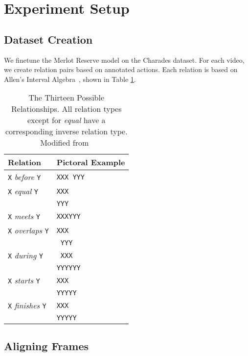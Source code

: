 \section{Experiment Setup}
\label{sec:setup}

\subsection{Dataset Creation}
\label{sec:data}

We finetune the Merlot Reserve model on the Charades dataset. For each video,
we create relation pairs based on annotated actions. Each relation is based on
Allen's Interval Algebra~\citep{allen1983interval}, shown in Table
\ref{tab:allen_interval}.

\begin{table}[htpb]
	\centering
	\caption{The Thirteen Possible Relationships. All relation types except for
		\textit{equal} have a corresponding inverse relation type. Modified
		from~\cite{allen1983interval}}
	\label{tab:allen_interval}
	\begin{tabular}{ll}
	Relation & Pictoral Example \\
	\hline
	\texttt{X} \textit{before} \texttt{Y} & \texttt{XXX YYY} \\
	\texttt{X} \textit{equal} \texttt{Y} & \texttt{XXX} \\
					   & \texttt{YYY} \\
	\texttt{X} \textit{meets} \texttt{Y} & \texttt{XXXYYY} \\
	\texttt{X} \textit{overlaps} \texttt{Y} & \texttt{XXX} \\
						& \texttt{ YYY} \\
	\texttt{X} \textit{during} \texttt{Y} & \texttt{ XXX} \\
						& \texttt{YYYYYY} \\
	\texttt{X} \textit{starts} \texttt{Y} & \texttt{XXX} \\
						& \texttt{YYYYY} \\
	\texttt{X} \textit{finishes} \texttt{Y} & \texttt{\space\space XXX} \\
							& \texttt{YYYYY} \\
	\end{tabular}
\end{table}

\subsection{Aligning Frames}

